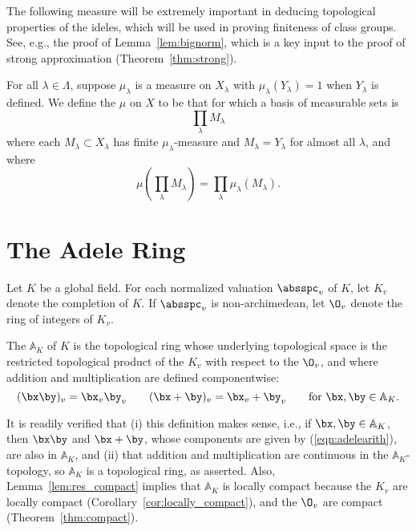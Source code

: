 \documentclass[11pt]{book}
\begin{document}
\begin{ch}
The following measure will be extremely important in deducing
topological properties of the ideles, which will be used in
proving finiteness of class groups.  See, e.g., the
proof of Lemma~\ref{lem:bignorm}, which is a key input
to the proof of strong approximation (Theorem~\ref{thm:strong}).
\begin{definition}\label{defn:prodmeasure}
  For all $\lambda\in\Lambda$, suppose $\mu_\lambda$ is a measure on
  $X_\lambda$ with $\mu_\lambda(Y_\lambda) = 1$ when $Y_\lambda$ is
  defined.  We define the  $\mu$ on $X$ to be
  that for which a basis of measurable sets is $$\prod_\lambda
  M_\lambda$$
  where each $M_\lambda\subset X_\lambda$ has finite
  $\mu_\lambda$-measure and
  $M_\lambda=Y_\lambda$ for almost all $\lambda$, and where
  $$
  \mu\left(\prod_\lambda M_\lambda\right) = \prod_\lambda
  \mu_\lambda(M_\lambda).
  $$
\end{definition}

\section{The Adele Ring}
Let $K$ be a global field.  For each normalized valuation $\absspc_v$ of $K$,
let $K_v$ denote the completion of $K$.  If $\absspc_v$ is
non-archimedean, let $\O_v$ denote the ring of integers of $K_v$.
\renewcommand{\AA}{\mathbb{A}}

\begin{definition}\label{def:adele}
  The  $\AA_K$ of $K$ is the topological ring whose
  underlying topological space is the restricted topological product
  of the $K_v$ with respect to the $\O_v$, and where addition and
  multiplication are defined componentwise:
\begin{equation}\label{eqn:adelearith}
(\bx \by)_v = \bx_v \by_v \qquad
(\bx + \by)_v = \bx_v + \by_v\qquad
\text{for }\bx, \by\in\AA_K.
\end{equation}
\end{definition}
It is readily verified that (i) this definition makes sense, i.e., if
$\bx, \by\in \AA_K$, then $\bx\by$ and $\bx+\by$, whose components are
given by (\ref{eqn:adelearith}), are also in $\AA_K$, and (ii) that
addition and multiplication are continuous in the $\AA_K$-topology, so
$\AA_K$ is a topological ring, as asserted.
Also,
Lemma~\ref{lem:res_compact} implies that $\AA_K$ is locally compact
because the $K_v$ are locally compact
(Corollary~\ref{cor:locally_compact}), and the $\O_v$ are
compact (Theorem~\ref{thm:compact}).


\end{ch}
\end{document}
